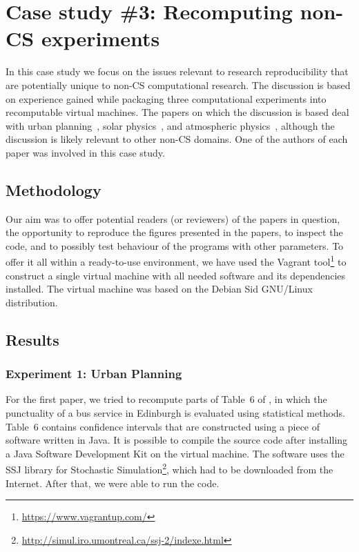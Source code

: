 \section{Case study \#3: Recomputing non-CS experiments}
\label{s:group3}

In this case study we focus on the issues relevant to research reproducibility that are potentially 
  unique to non-CS computational research.
The discussion is based on experience gained while packaging three computational experiments 
  into recomputable virtual machines.
The papers on which the discussion is based 
  deal with urban planning~\cite{danielpaper}, solar
  physics~\cite{bareford2010nanoflare}, and atmospheric
  physics~\cite{arabas2013libcloud},
  although the discussion is likely relevant to other non-CS domains. One of the
  authors of each paper was involved in this case study.

\subsection{Methodology}

Our aim was to offer potential readers (or reviewers) of the papers in question, 
  the opportunity to reproduce the figures presented in the papers, 
  to inspect the code, and to possibly test behaviour of the programs with other parameters.
To offer it all within a ready-to-use environment, we have used the Vagrant
tool\footnote{\url{https://www.vagrantup.com/}}
to
  construct a single virtual machine with all needed software and its dependencies installed.
The virtual machine was based on the Debian Sid GNU/Linux distribution.

\subsection{Results}
\subsubsection*{Experiment 1: Urban Planning}

For the first paper, we tried to recompute parts of Table~6 of
\cite{danielpaper}, in which the punctuality of a bus service in Edinburgh is
evaluated using statistical methods. Table~6 contains confidence intervals that
are constructed using a piece of software written in Java. It is possible to
compile the source code after installing a Java Software Development Kit on the
virtual machine. The software uses the SSJ library for Stochastic
Simulation\footnote{\url{http://simul.iro.umontreal.ca/ssj-2/indexe.html}},
which had to be downloaded from the Internet. After that, we were able to run
the code.

